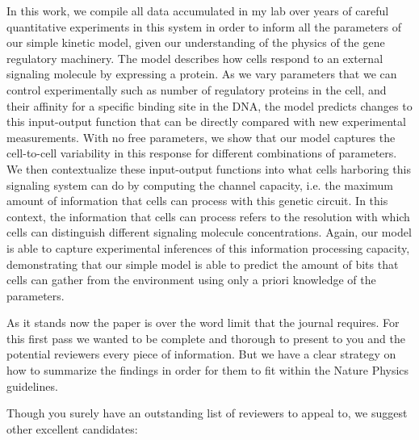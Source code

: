 In this work, we compile all data accumulated in my lab over years of careful
quantitative experiments in this system in order to inform all the parameters of
our simple kinetic model, given our understanding of the physics of the gene
regulatory machinery. The model describes how cells respond to an external
signaling molecule by expressing a protein. As we vary parameters that we can
control experimentally such as number of regulatory proteins in the cell, and
their affinity for a specific binding site in the DNA, the model predicts
changes to this input-output function that can be directly compared with new
experimental measurements. With no free parameters, we show that our model
captures the cell-to-cell variability in this response for different
combinations of parameters. We then contextualize these input-output functions
into what cells harboring this signaling system can do by computing the channel
capacity, i.e. the maximum amount of information that cells can process with
this genetic circuit. In this context, the information that cells can process
refers to the resolution with which cells can distinguish different signaling
molecule concentrations. Again, our model is able to capture experimental
inferences of this information processing capacity, demonstrating that our
simple model is able to predict the amount of bits that cells can gather from
the environment using only a priori knowledge of the parameters.

As it stands now the paper is over the word limit that the journal requires. For
this first pass we wanted to be complete and thorough to present to you and the
potential reviewers every piece of information. But we have a clear strategy on
how to summarize the findings in order for them to fit within the Nature Physics
guidelines.

Though you surely have an outstanding list of reviewers to appeal to, we suggest
other excellent candidates:

